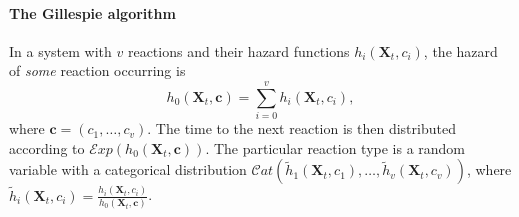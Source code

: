 \paragraph{The Gillespie algorithm}
In a system with $v$ reactions and their hazard functions $h_i(\bm{X}_t, c_i)$, the hazard of \emph{some} reaction occurring is
\begin{equation*}
h_0(\bm{X}_t, \bm{c}) = \sum_{i=0}^v h_i(\bm{X}_t, c_i),
\end{equation*}
where $\bm{c} = \left(c_1, \ldots, c_v\right)$. The time to the next reaction is then distributed according to $\mathcal{E}\mathit{xp}(h_0(\bm{X}_t, \bm{c}))$. The particular reaction type is a random variable with a categorical distribution $\mathcal{C}\mathit{at}(\widetilde{h}_1(\bm{X}_t,c_1), \ldots, \widetilde{h}_v(\bm{X}_t,c_v))$, where $\displaystyle \widetilde{h}_i(\bm{X}_t,c_i) = \frac{h_i(\bm{X}_t,c_i)}{h_0(\bm{X}_t, \bm{c})}$.

